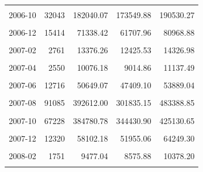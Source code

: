 \begin{longtable}[t]{crrrr}
\cellcolor{gray!10}{2006-09} & \cellcolor{gray!10}{76475} & \cellcolor{gray!10}{370835.47} & \cellcolor{gray!10}{346952.92} & \cellcolor{gray!10}{394718.03}\\
2006-10 & 32043 & 182040.07 & 173549.88 & 190530.27\\
\cellcolor{gray!10}{2006-11} & \cellcolor{gray!10}{29302} & \cellcolor{gray!10}{137405.50} & \cellcolor{gray!10}{113601.98} & \cellcolor{gray!10}{161209.02}\\
2006-12 & 15414 & 71338.42 & 61707.96 & 80968.88\\
\cellcolor{gray!10}{2007-01} & \cellcolor{gray!10}{4220} & \cellcolor{gray!10}{21837.30} & \cellcolor{gray!10}{18738.87} & \cellcolor{gray!10}{24935.73}\\
2007-02 & 2761 & 13376.26 & 12425.53 & 14326.98\\
\cellcolor{gray!10}{2007-03} & \cellcolor{gray!10}{3340} & \cellcolor{gray!10}{13281.56} & \cellcolor{gray!10}{12074.25} & \cellcolor{gray!10}{14488.88}\\
2007-04 & 2550 & 10076.18 & 9014.86 & 11137.49\\
\cellcolor{gray!10}{2007-05} & \cellcolor{gray!10}{5123} & \cellcolor{gray!10}{19962.84} & \cellcolor{gray!10}{18613.08} & \cellcolor{gray!10}{21312.60}\\
2007-06 & 12716 & 50649.07 & 47409.10 & 53889.04\\
\cellcolor{gray!10}{2007-07} & \cellcolor{gray!10}{19931} & \cellcolor{gray!10}{67341.34} & \cellcolor{gray!10}{51437.76} & \cellcolor{gray!10}{83244.91}\\
2007-08 & 91085 & 392612.00 & 301835.15 & 483388.85\\
\cellcolor{gray!10}{2007-09} & \cellcolor{gray!10}{141220} & \cellcolor{gray!10}{653959.55} & \cellcolor{gray!10}{576137.33} & \cellcolor{gray!10}{731781.77}\\
2007-10 & 67228 & 384780.78 & 344430.90 & 425130.65\\
\cellcolor{gray!10}{2007-11} & \cellcolor{gray!10}{31421} & \cellcolor{gray!10}{146974.50} & \cellcolor{gray!10}{119195.53} & \cellcolor{gray!10}{174753.46}\\
2007-12 & 12320 & 58102.18 & 51955.06 & 64249.30\\
\cellcolor{gray!10}{2008-01} & \cellcolor{gray!10}{2777} & \cellcolor{gray!10}{15069.10} & \cellcolor{gray!10}{12552.36} & \cellcolor{gray!10}{17585.85}\\
2008-02 & 1751 & 9477.04 & 8575.88 & 10378.20\\
\cellcolor{gray!10}{2008-03} & \cellcolor{gray!10}{1887} & \cellcolor{gray!10}{8409.29} & \cellcolor{gray!10}{6944.92} & \cellcolor{gray!10}{9873.66}\\

\end{longtable}
